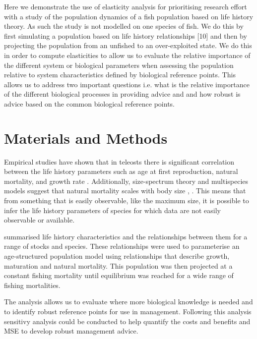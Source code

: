 \documentclass[%
nonumbib,      %
%
]{nrc1}                          %
\begin{document}
Here we demonstrate the use of elasticity analysis for prioritising research eﬀort with a study of the population dynamics of a fish population based on life history theory. As such the study is not modelled on one species of fish. We do this by first simulating a population based on life history relationships [10] and then by projecting the population from an unfished to an over-exploited state. We do this in order to compute elasticities to allow us to evaluate the relative importance of the diﬀerent system or biological parameters when assessing the population relative to system characteristics defined by biological reference points. This allows us to address two important questions i.e. what is the relative importance of the diﬀerent biological processes in providing advice and and how robust is advice based on the common biological reference points. 


\section*{Materials and Methods}

Empirical studies have shown that in teleosts there is significant correlation between the life history parameters  
such as age at first reproduction, natural mortality, and growth rate \cite{roff1984evolution}. Additionally, size-spectrum theory 
and multispecies models suggest that natural mortality scales with body size \cite{andersen2006asymptotic}, 
\cite{pope2006modelling} \cite{gislason2008coexistence}. This means that from something that is easily observable, like the maximum size,
it is possible to infer the life history parameters of species for which data are not easily observable or available.

\cite{gislason2008coexistence} summarised life history characteristics and the relationships between them for a range of stocks and species. 
These relationships were used to parameterise an age-structured population model using relationships that describe growth, maturation and natural mortality.
This population was then projected at a constant fishing mortality until equilibrium was reached for a wide range of fishing mortalities.

The analysis allows us to evaluate where more biological knowledge is needed and to identify robust reference points for use in management. Following this analysis
sensitivy analysis could be conducted to help quantify the costs and benefits and MSE to develop robust management advice.
\end{document}
